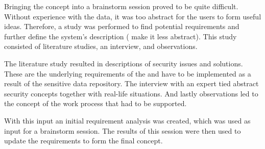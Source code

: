 Bringing the \ivfsystem{} concept into a brainstorm session proved to be quite difficult. Without experience with the data, it was too abstract for the users to form useful ideas.
Therefore, a study was performed to find potential requirements and further define the system's description (\ie{} make it less abstract).
This study consisted of literature studies, an interview, and observations.

The literature study resulted in descriptions of security issues and solutions.
These are the underlying requirements of the \ivfsystem{} and have to be implemented as a result of the sensitive data repository.
The interview with an expert tied abstract security concepts together with real-life situations.
And lastly observations led to the concept of the work process that had to be supported. 

With this input an initial requirement analysis was created, which was used as input for a brainstorm session.
The results of this session were then used to update the requirements to form the final concept.

